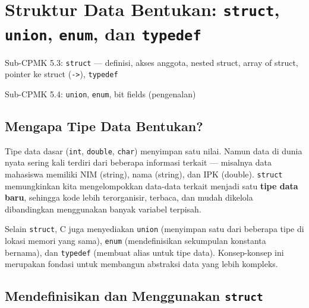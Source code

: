 \documentclass[../main.tex]{subfiles}
\begin{document}
\chapter{Struktur Data Bentukan: \texttt{struct}, \texttt{union}, \texttt{enum}, dan \texttt{typedef}}

\begin{subcpmk}
  \item Sub-CPMK 5.3: \texttt{struct} --- definisi, akses anggota, nested struct, array of struct, pointer ke struct (\texttt{->}), \texttt{typedef}
  \item Sub-CPMK 5.4: \texttt{union}, \texttt{enum}, bit fields (pengenalan)
\end{subcpmk}


\section{Mengapa Tipe Data Bentukan?}

Tipe data dasar (\texttt{int}, \texttt{double}, \texttt{char}) menyimpan satu nilai. Namun data di dunia nyata sering kali terdiri dari beberapa informasi terkait --- misalnya data mahasiswa memiliki NIM (string), nama (string), dan IPK (double). \texttt{struct} memungkinkan kita mengelompokkan data-data terkait menjadi satu \textbf{tipe data baru}, sehingga kode lebih terorganisir, terbaca, dan mudah dikelola dibandingkan menggunakan banyak variabel terpisah.

Selain \texttt{struct}, C juga menyediakan \texttt{union} (menyimpan satu dari beberapa tipe di lokasi memori yang sama), \texttt{enum} (mendefinisikan sekumpulan konstanta bernama), dan \texttt{typedef} (membuat alias untuk tipe data). Konsep-konsep ini merupakan fondasi untuk membangun abstraksi data yang lebih kompleks.

\section{Mendefinisikan dan Menggunakan \texttt{struct}}
\end{document}

